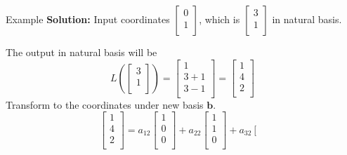\documentclass{beamer}
\begin{document}
\begin{frame}{Example}
\textbf{Solution:}\newline
Input coordinates $\left[ \begin{array}{c}
    0\\
    1\\
\end{array} \right]$, which is $\left[ \begin{array}{c}
    3\\
    1\\
\end{array} \right]$ in natural basis.

The output in natural basis will be
\begin{equation*}
    L\left( \left[ \begin{array}{c}
        3\\
        1\\
    \end{array} \right] \right) =\left[ \begin{array}{c}
        1\\
        3+1\\
        3-1\\
    \end{array} \right] =\left[ \begin{array}{c}
        1\\
        4\\
        2\\
    \end{array} \right]
\end{equation*}
Transform to the coordinates under new basis $\mathbf{b}$.
\begin{equation*}
    \left[ \begin{array}{c}
        1\\
        4\\
        2\\
    \end{array} \right] =a_{12}\left[ \begin{array}{c}
        1\\
        0\\
        0\\
    \end{array} \right] +a_{22}\left[ \begin{array}{c}
        1\\
        1\\
        0\\
    \end{array} \right] +a_{32}\left[ \begin{array}{c}

\end{array}
\end{equation*}
\end{frame}
\end{document}
